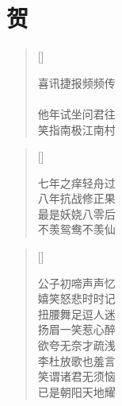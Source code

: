 \chapter{贺}
\thispagestyle{empty}
\renewcommand{\poemtoc}{section}
\settowidth{\versewidth}{喜讯捷报频频传}
\begin{verse}[\versewidth]

喜讯捷报频频传\\
\\
他年试坐问君往\\
笑指南极江南村
\end{verse}

\renewcommand{\poemtoc}{section}
\settowidth{\versewidth}{七年之痒轻舟过}
\begin{verse}[\versewidth]

七年之痒轻舟过\\
八年抗战修正果\\
最是妖娆八零后\\
不羡鸳鸯不羡仙\\
\end{verse}

\renewcommand{\poemtoc}{section}
\settowidth{\versewidth}{公子初啼声声忆}
\begin{verse}[\versewidth]

公子初啼声声忆\\
嬉笑怒悲时时记\\
扭腰舞足逗人迷\\
扬眉一笑惹心醉\\
欲夸无奈才疏浅\\
李杜放歌也羞言\\
笑谓诸君无须恼\\
已是朝阳天地耀\\
\end{verse}
